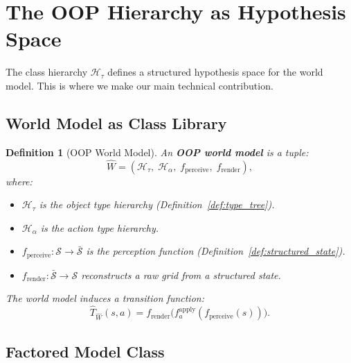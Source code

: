 \documentclass{article}
\newtheorem{definition}{Definition}
\newcommand{\calS}{\mathcal{S}}
\newcommand{\calH}{\mathcal{H}}
\begin{document}

\section{The OOP Hierarchy as Hypothesis Space}
\label{sec:hypothesis_space}

The class hierarchy $\calH_\tau$ defines a structured hypothesis space for the
world model.  This is where we make our main technical contribution.

\subsection{World Model as Class Library}
\label{sec:class_library}

\begin{definition}[OOP World Model]
\label{def:oop_world_model}
An \textbf{OOP world model} is a tuple:
\begin{equation}
\hat{W} = (\calH_\tau, \; \calH_\alpha, \; f_{\text{perceive}}, \;
           f_{\text{render}}),
\end{equation}
where:
\begin{itemize}[nosep]
    \item $\calH_\tau$ is the object type hierarchy (Definition~\ref{def:type_tree}).
    \item $\calH_\alpha$ is the action type hierarchy.
    \item $f_{\text{perceive}} : \calS \to \bar{\calS}$ is the perception
          function (Definition~\ref{def:structured_state}).
    \item $f_{\text{render}} : \bar{\calS} \to \calS$ reconstructs a raw grid
          from a structured state.
\end{itemize}
The world model induces a transition function:
\begin{equation}
\hat{T}_{\hat{W}}(s, a) = f_{\text{render}}\bigl(
    f_a^{\text{apply}}(f_{\text{perceive}}(s))\bigr).
\end{equation}
\end{definition}

\subsection{Factored Model Class}
\label{sec:factored}
\end{document}
